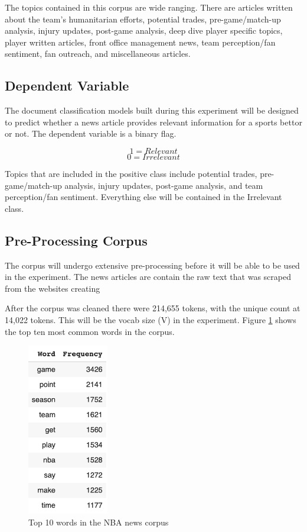 \documentclass[5p,authoryear]{elsarticle}
\begin{document}
The topics contained in this corpus are wide ranging. There are articles written about the team's humanitarian efforts, potential trades, pre-game/match-up analysis, injury updates, post-game analysis, deep dive player specific topics, player written articles, front office management news, team perception/fan sentiment, fan outreach, and miscellaneous articles.


\subsection{Dependent Variable}\label{dependent}

The document classification models built during this experiment will be designed to predict whether a news article provides relevant information for a sports bettor or not. The dependent variable is a binary flag. 

$$1 = Relevant$$
$$0 = Irrelevant$$

Topics that are included in the positive class include potential trades, pre-game/match-up analysis, injury updates, post-game analysis, and team perception/fan sentiment. Everything else will be contained in the Irrelevant class.


\subsection{Pre-Processing Corpus}\label{dependent}

The corpus will undergo extensive pre-processing before it will be able to be used in the experiment. The news articles are contain the raw text that was scraped from the websites creating 

After the corpus was cleaned there were 214,655 tokens, with the unique count at 14,022 tokens. This will be the vocab size (V) in the experiment. Figure \ref{word freq} shows the top ten most common words in the corpus.

\begin{figure}[!h] 
    \centering
	\includegraphics[width=1.4in]{figures/top_10_words.png}
	\caption[]{Top 10 words in the NBA news corpus} 
	\label{word freq} 
\end{figure}
\end{document}
